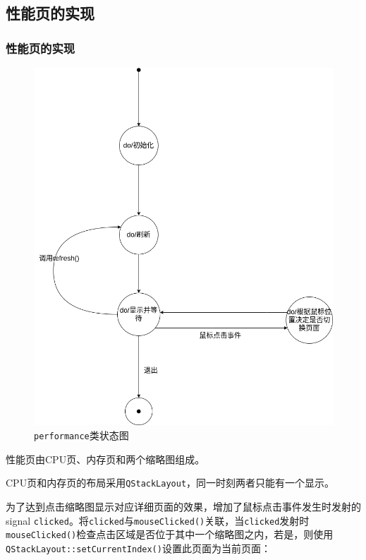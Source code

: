 \documentclass{beamer}
\newcommand\code[1]{\texttt{#1}}
\begin{document}
\subsection{性能页的实现}
\label{subsec:perf}
\begin{frame}
    \frametitle{性能页的实现}
    \begin{figure}
        \centering
        \includegraphics[scale=0.23]{../dia/performance.png}
        \caption{\code{performance}类状态图}
    \end{figure}
\end{frame}

\begin{frame}
    性能页由CPU页、内存页和两个缩略图组成。

CPU页和内存页的布局采用\code{QStackLayout}，同一时刻两者只能有一个显示。

为了达到点击缩略图显示对应详细页面的效果，增加了鼠标点击事件发生时发射的signal \code{clicked}。将\code{clicked}与\code{mouseClicked()}关联，当\code{clicked}发射时\code{mouseClicked()}检查点击区域是否位于其中一个缩略图之内，若是，则使用\code{QStackLayout::setCurrentIndex()}设置此页面为当前页面：

{
    \ttfamily
    
}
\end{frame}
\end{document}

